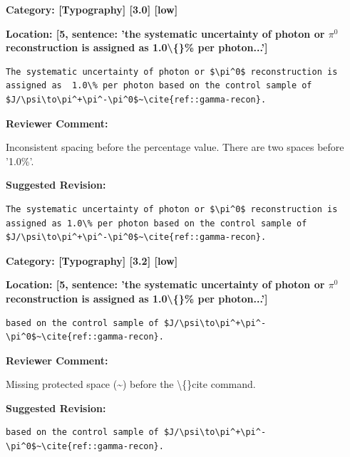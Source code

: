 \documentclass[12pt]{article}
\begin{document}
\begin{reviewer}
\noindent \textbf{Category: [Typography] [3.0] [low]}

\noindent \textbf{Location: [5, sentence: 'the systematic uncertainty of photon or $\pi^0$ reconstruction is assigned as  1.0\textbackslash\{\}\% per photon...']}

\begin{lstlisting}[breaklines=true]
	The systematic uncertainty of photon or $\pi^0$ reconstruction is assigned as  1.0\% per photon based on the control sample of $J/\psi\to\pi^+\pi^-\pi^0$~\cite{ref::gamma-recon}.
\end{lstlisting}

\textbf{Reviewer Comment:}

Inconsistent spacing before the percentage value. There are two spaces before '1.0\%'.

\textbf{Suggested Revision:}

\begin{lstlisting}[breaklines=true]
	The systematic uncertainty of photon or $\pi^0$ reconstruction is assigned as 1.0\% per photon based on the control sample of $J/\psi\to\pi^+\pi^-\pi^0$~\cite{ref::gamma-recon}.
\end{lstlisting}

\end{reviewer}

\begin{reviewer}
\noindent \textbf{Category: [Typography] [3.2] [low]}

\noindent \textbf{Location: [5, sentence: 'the systematic uncertainty of photon or $\pi^0$ reconstruction is assigned as  1.0\textbackslash\{\}\% per photon...']}

\begin{lstlisting}[breaklines=true]
	based on the control sample of $J/\psi\to\pi^+\pi^-\pi^0$~\cite{ref::gamma-recon}.
\end{lstlisting}

\textbf{Reviewer Comment:}

Missing protected space (\textasciitilde{}) before the \textbackslash\{\}cite command.

\textbf{Suggested Revision:}

\begin{lstlisting}[breaklines=true]
	based on the control sample of $J/\psi\to\pi^+\pi^-\pi^0$~\cite{ref::gamma-recon}.
\end{lstlisting}

\end{reviewer}
\end{document}

